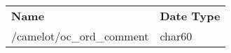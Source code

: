 \begin{tabu}{p{0.5\textwidth}p{0.46\textwidth }}
\rowfont{\bfseries\leavevmode\color{headingfont}}\textbf{Name} & \textbf{Date Type} \\
/camelot/oc\_ord\_comment & char60 \\
\end{tabu}